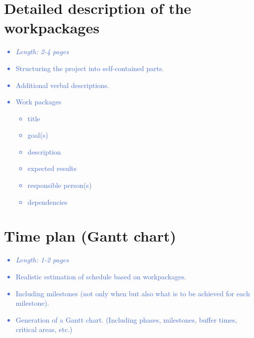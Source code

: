 \documentclass[a4paper,11pt]{article}
\providecommand*{\note}[1]{\small \textcolor{RoyalBlue}{\begin{minipage}{\textwidth}{#1}\end{minipage}}}
\begin{document}

\section{Detailed description of the workpackages}
\label{sect:workplan}

\note{
\begin{itemize}
\item {\em Length: 2-4 pages}
\item Structuring the project into self-contained parts.
\item Additional verbal descriptions.
\item Work packages
    \begin{itemize}
    \item title
    \item goal(s)
    \item description
    \item expected results
    \item responsible person(s)
    \item dependencies
    \end{itemize}
\end{itemize}
}

\section{Time plan (Gantt chart)}
\label{sect:timeplan}

\note{
\begin{itemize}
\item {\em Length: 1-2 pages}
\item Realistic estimation of schedule based on workpackages.
\item Including milestones (not only when but also what is to be achieved for each milestone).
\item Generation of a Gantt chart. (Including phases, milestones, buffer times, critical areas, etc.)
\end{itemize}
}
\end{document}
